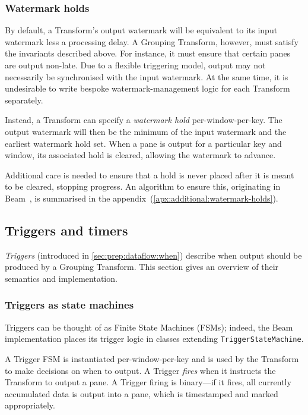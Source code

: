 \subsubsection{Watermark holds}

By default, a Transform's output watermark will be equivalent to its input watermark less a processing delay.
A Grouping Transform, however, must satisfy the invariants described above.
For instance, it must ensure that certain panes are output non-late.
Due to a flexible triggering model, output may not necessarily be synchronised with the input watermark.
At the same time, it is undesirable to write bespoke watermark-management logic for each Transform separately.

Instead, a Transform can specify a \emph{watermark hold} per-window-per-key.
The output watermark will then be the minimum of the input watermark and the earliest watermark hold set.
When a pane is output for a particular key and window, its associated hold is cleared, allowing the watermark to advance.

Additional care is needed to ensure that a hold is never placed after it is meant to be cleared, stopping progress.
An algorithm to ensure this, originating in Beam~\cite{BEAM-code-WatermarkManager}, is summarised in the appendix~(\cref{apx:additional:watermark-holds}).

\subsection{Triggers and timers}\label{sec:impl:dataflow:triggers-timers}

\emph{Triggers} (introduced in \cref{sec:prep:dataflow:when}) describe when output should be produced by a Grouping Transform.
This section gives an overview of their semantics and implementation.

\subsubsection{Triggers as state machines}
Triggers can be thought of as Finite State Machines (FSMs); indeed, the Beam implementation places its trigger logic in classes extending \verb|TriggerStateMachine|.

A Trigger FSM is instantiated per-window-per-key and is used by the Transform to make decisions on when to output.
A Trigger \emph{fires} when it instructs the Transform to output a pane.
A Trigger firing is binary---if it fires, all currently accumulated data is output into a pane, which is timestamped and marked appropriately.

